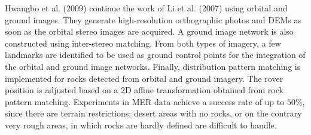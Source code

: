 Hwangbo et al. (2009) continue the work of Li et al. (2007)
using orbital and ground images.
They generate high-resolution orthographic photos and DEMs as soon as the
orbital stereo images are acquired.
A ground image network is also constructed using inter-stereo matching.
From both types of imagery, a few landmarks are identified to be used as
ground control points for the integration of the orbital and ground
image networks.
Finally, distribution pattern matching is implemented for rocks detected
from orbital and ground imagery.
The rover position is adjusted based on a 2D affine transformation
obtained from rock pattern matching.
Experiments in MER data achieve a success rate of up to $50\%$, since
there are terrain restrictions: desert areas with no rocks,
or on the contrary very rough areas, in which rocks are hardly
defined are difficult to handle.




